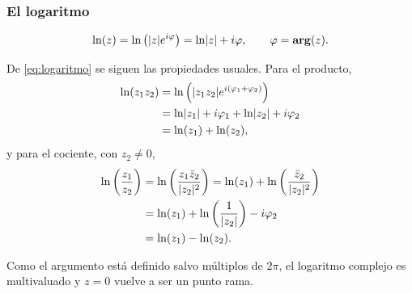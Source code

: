 \subsubsection{El logaritmo}
\label{subsubsec:logaritmo}

\begin{definicion}
  \label{def:logaritmo}
  \begin{equation}
    \label{eq:logaritmo}
    \ln(z)=\ln\left( \lvert z \rvert e^{i\varphi} \right)=\ln\lvert z \rvert+i\varphi,
    \qquad \varphi=\operatorname{\mathbf{arg}}(z).
  \end{equation}
\end{definicion}

De \eqref{eq:logaritmo} se siguen las propiedades usuales. Para el producto,
\begin{equation}
  \label{eq:log_producto}
  \begin{aligned}
    \ln(z_1z_2)
      &=\ln\left( \lvert z_1z_2 \rvert e^{i(\varphi_1+\varphi_2)} \right)\\
      &=\ln\lvert z_1 \rvert+i\varphi_1+\ln\lvert z_2 \rvert+i\varphi_2\\
      &=\ln(z_1)+\ln(z_2),
  \end{aligned}
\end{equation}
y para el cociente, con $z_2\neq 0$,
\begin{equation}
  \label{eq:log_cociente}
  \begin{aligned}
    \ln\left( \frac{z_1}{z_2} \right)
      &=\ln\left( \frac{z_1\bar{z}_2}{\lvert z_2 \rvert^2} \right)
       =\ln(z_1)+\ln\left( \frac{\bar{z}_2}{\lvert z_2 \rvert^2} \right)\\
      &=\ln(z_1)+\ln\left( \frac{1}{\lvert z_2 \rvert} \right)-i\varphi_2\\
      &=\ln(z_1)-\ln(z_2).
  \end{aligned}
\end{equation}

\begin{observacion}
  Como el argumento est\'a definido salvo m\'ultiplos de $2\pi$, el logaritmo
  complejo es multivaluado y $z=0$ vuelve a ser un punto rama.
\end{observacion}
